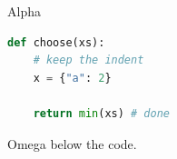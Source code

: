 \documentclass[11pt,aspectratio=169]{beamer}
\begin{document}
\begin{frame}[fragile]{Alpha}
\begin{lstlisting}[language=Python]
def choose(xs):
    # keep the indent
    x = {"a": 2}

    return min(xs) # done
\end{lstlisting}
\small Omega below the code.
\end{frame}
\end{document}
